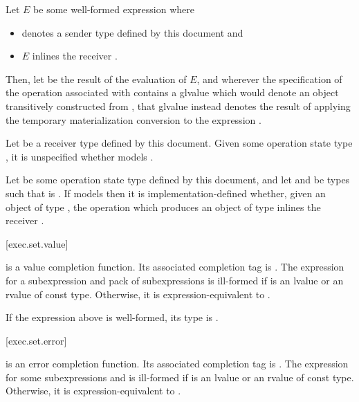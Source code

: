 \pnum
Let $E$ be some well-formed expression  where
\begin{itemize}
\item
{} denotes a sender type defined by this document and
\item
$E$ inlines the receiver .
\end{itemize}
Then, let  be the result of the evaluation of $E$, and
wherever the specification of the operation associated with 
contains a glvalue
which would denote an object transitively constructed from ,
that glvalue instead denotes the result of applying
the temporary materialization conversion to the expression
.

\pnum
Let  be a receiver type defined by this document.
Given some operation state type ,
it is unspecified
whether  models .

\pnum
Let  be some operation state type defined by this document,
and let  and  be types such that
 is .
If  models 
then it is implementation-defined whether,
given an object  of type ,
the  operation which produces an object of type 
inlines the receiver .

[exec.set.value]{}

\pnum
{} is a value completion function.
Its associated completion tag is .
The expression 
for a subexpression  and
pack of subexpressions  is ill-formed
if  is an lvalue or an rvalue of const type.
Otherwise, it is expression-equivalent to
.

\mandates
If the expression above is well-formed, its type is .

[exec.set.error]{}

\pnum
{} is an error completion function.
Its associated completion tag is .
The expression 
for some subexpressions  and  is ill-formed
if  is an lvalue or an rvalue of const type.
Otherwise, it is expression-equivalent to
.

